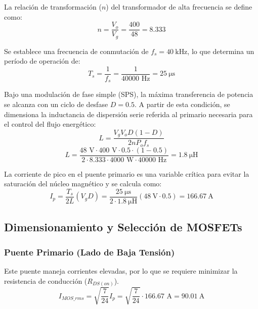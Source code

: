 \documentclass[11pt, a4paper]{article}
\begin{document}
   La relación de transformación ($n$) del transformador de alta frecuencia se define como:
\begin{equation}
    n = \frac{V_o}{V_g} = \frac{400}{48} = 8.333
\end{equation}

Se establece una frecuencia de conmutación de $f_s = \SI{40}{\kilo\hertz}$, lo que determina un período de operación de:
\begin{equation}
    T_s = \frac{1}{f_s} = \frac{1}{40000\text{ Hz}} = \SI{25}{\micro\second}
\end{equation}

Bajo una modulación de fase simple (SPS), la máxima transferencia de potencia se alcanza con un ciclo de desfase $D = 0.5$. A partir de esta condición, se dimensiona la inductancia de dispersión serie referida al primario necesaria para el control del flujo energético:
\begin{equation}
    L = \frac{V_g V_o D(1-D)}{2 n P_o f_s}
\end{equation}
\begin{equation}
    L = \frac{48\text{ V} \cdot 400\text{ V} \cdot 0.5 \cdot (1-0.5)}{2 \cdot 8.333 \cdot 4000\text{ W} \cdot 40000\text{ Hz}} = \SI{1.8}{\micro\henry}
\end{equation}

La corriente de pico en el puente primario es una variable crítica para evitar la saturación del núcleo magnético y se calcula como:
\begin{equation}
    I_p = \frac{T_s}{2L}(V_g D) = \frac{\SI{25}{\micro\second}}{2\cdot\SI{1.8}{\micro\henry}}\left(\SI{48}{\volt}\cdot 0.5\right) = \SI{166.67}{\ampere}
\end{equation}

\subsection{Dimensionamiento y Selección de MOSFETs}

\subsubsection{Puente Primario (Lado de Baja Tensión)}

Este puente maneja corrientes elevadas, por lo que se requiere minimizar la resistencia de conducción ($R_{DS(on)}$). 
\begin{equation}
    I_{MOS\_rms} = \sqrt{\frac{7}{24}} I_p = \sqrt{\frac{7}{24}} \cdot 166.67\text{ A} = \SI{90.01}{\ampere}
\end{equation}
\end{document}
